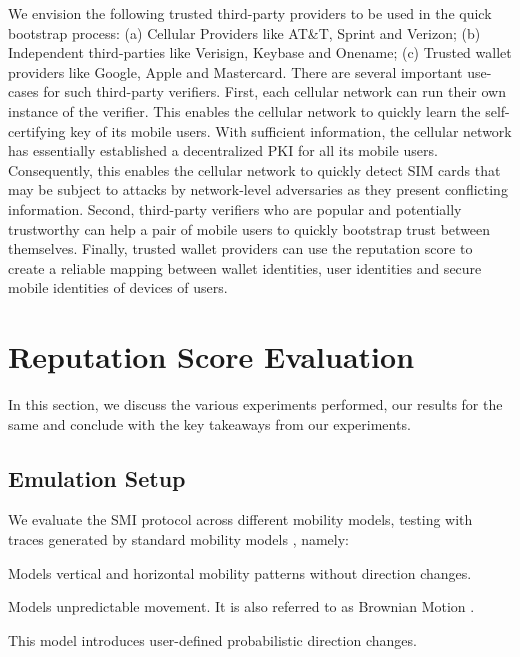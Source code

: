 \documentclass[letterpaper,twocolumn]{sig-alternate}
\begin{document}
We envision the following trusted third-party providers to be used in the quick bootstrap process: (a) Cellular Providers like AT\&T, Sprint and Verizon; (b) Independent third-parties like Verisign, Keybase and Onename; (c) Trusted wallet providers like Google, Apple and Mastercard. There are several important use-cases for such third-party verifiers. First, each cellular network can run their own instance of the verifier. This enables the cellular network
to quickly learn the self-certifying key of its mobile users. With sufficient information, the cellular network has essentially established a decentralized PKI for all its mobile users. Consequently, this enables the cellular network to quickly detect SIM cards that may be subject to attacks by network-level adversaries as they present conflicting information. Second, third-party verifiers who are popular and potentially trustworthy can help a pair of mobile users to quickly bootstrap trust between themselves. Finally, trusted wallet providers can use the reputation score to create a reliable mapping between wallet identities, user identities and secure mobile identities of devices of users. 

 \section{Reputation Score Evaluation}
\label{eval}

In this section, we discuss the various experiments performed, our results for the same and conclude with the key takeaways from our experiments. 


\subsection{Emulation Setup}
\label{setup}

We evaluate the SMI protocol across different mobility models, testing with traces generated by standard mobility models \cite{smooth,citymob}, namely:

\vspace{1mm}
 Models vertical and horizontal mobility patterns without direction changes.

\vspace{1mm}
 Models unpredictable movement. It is also referred to as Brownian Motion \cite{hida1980brownian}.

\vspace{1mm}
 This model introduces user-defined probabilistic direction changes.
\end{document}
